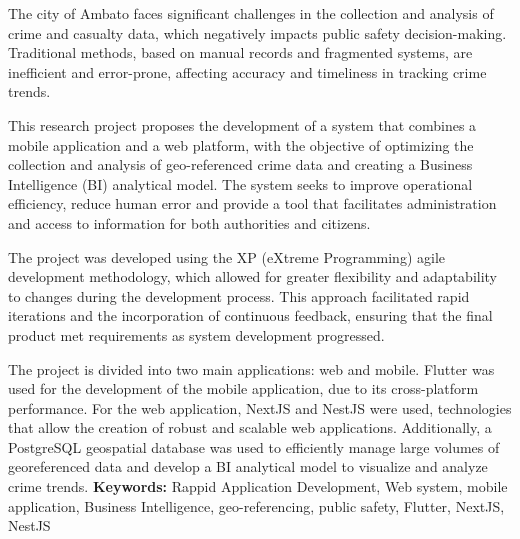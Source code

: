 \newpage
{}
The city of Ambato faces significant challenges in the collection and analysis of crime and casualty data,
which negatively impacts public safety decision-making. Traditional methods, based on manual records and
fragmented systems, are inefficient and error-prone, affecting accuracy and timeliness in tracking crime trends.
\bigbreak

This research project proposes the development of a system that combines a mobile application and a web platform,
with the objective of optimizing the collection and analysis of geo-referenced crime data and creating a Business
Intelligence (BI) analytical model. The system seeks to improve operational efficiency, reduce human error and provide
a tool that facilitates administration and access to information for both authorities and citizens.
\bigbreak

The project was developed using the XP (eXtreme Programming) agile development methodology, which allowed for greater flexibility
and adaptability to changes during the development process. This approach facilitated rapid iterations and the incorporation
of continuous feedback, ensuring that the final product met requirements as system development progressed.
\bigbreak

The project is divided into two main applications: web and mobile. Flutter was used for the development of the mobile
application, due to its cross-platform performance. For the web application, NextJS and NestJS were used, technologies
that allow the creation of robust and scalable web applications. Additionally, a PostgreSQL geospatial database was
used to efficiently manage large volumes of georeferenced data and develop a BI analytical model to visualize and
analyze crime trends.
\vfill
\textbf{Keywords:} Rappid Application Development, Web system, mobile application, Business Intelligence,
geo-referencing, public safety, Flutter, NextJS, NestJS
